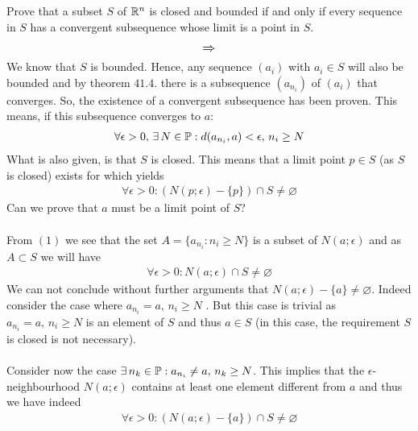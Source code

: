 \subsection{}
\begin{tcolorbox}
Prove that a subset $S$ of $\mathbb{R}^n$ is closed and bounded if and only if
every sequence in $S$ has a convergent subsequence whose limit
is a point in $S$.
\end{tcolorbox}
$$\mathbf{\mathlarger{\implies}}$$
We know that $S$ is bounded. Hence, any sequence $(a_i)$ with $a_i\in S$ will also be bounded and by theorem $\mathbf{41.4.}$ there is a subsequence $(a_{n_i})$ of $(a_i)$ that converges. So, the existence of a convergent subsequence has been proven.
This means, if this subsequence converges to $a$:
\begin{align}
\forall \epsilon>0,\, \exists\, N\in\mathbb{P}: d(a_{n_i},a)<\epsilon,\, n_i\geq N
\end{align}
What is also given, is that $S$ is closed. This means that a limit point $p\in S$ (as $S$ is closed) exists for which yields
\begin{align*}
\forall\epsilon>0: \left(N(p;\epsilon)-\{p\}\right)\cap S\neq \varnothing
\end{align*}
Can we prove that $a$ must be a limit point of $S$?\\\\
From $(1)$ we see that the set $A= \{a_{n_i}: n_i\geq N\}$ is a subset of $N(a;\epsilon)$ and as $A\subset S$ we will have
\begin{align*}
\forall\epsilon>0: N(a;\epsilon)\cap S\neq \varnothing
\end{align*}
 We can not conclude without further arguments that $N(a;\epsilon)-\{a\}\neq \varnothing$. Indeed consider the case where $a_{n_i}=a,\, n_i\geq N$ . But this case is trivial as $a_{n_i}=a,\, n_i\geq N$ is an element of $S$ and thus $a\in S$ (in this case, the requirement  $S$ is closed  is not necessary).\\\\
Consider now the case $\exists\, n_k\in \mathbb{P}: a_{n_i}\neq a,\, n_k\geq N$. This implies that the $\epsilon$-neighbourhood $N(a;\epsilon)$ contains at least one element different from $a$ and thus we have indeed
\begin{align*}
\forall\epsilon>0: \left(N(a;\epsilon)-\{a\}\right)\cap S\neq \varnothing
\end{align*}
